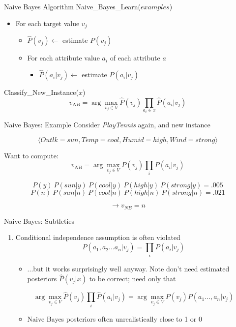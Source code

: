 \documentclass[%
pdf,
colorBG,
slideColor,
tcrico,
]{prosper}
\begin{document}
\begin{slide}{ Naive Bayes Algorithm   }  
\tiny
Naive\_Bayes\_Learn($examples$)
\begin{itemize} 
\item[]
For each target value $v_j$
\begin{itemize}
\item[]
$\hat{P}(v_j) \gets$ estimate $P(v_j)$
\item[] For each attribute value $a_i$ of each attribute $a$
\begin{itemize} \item[] $\hat{P}(a_i|v_j) \gets$ estimate $P(a_i|v_j)$ \end{itemize}
\end{itemize}
\end{itemize}

\vspace*{.2in}
Classify\_New\_Instance($x$)
\[ v_{NB} = \arg\max_{v_{j} \in V} \hat{P}(v_{j}) \prod_{a_i \in x} \hat{P}(a_{i} | v_{j}) \]
\end{slide}



\begin{slide}{ Naive Bayes: Example   }  
\tiny
Consider {\em PlayTennis} again, and new instance 

 \[\langle Outlk=sun, Temp=cool, Humid=high, Wind=strong \rangle \]

Want to compute:
\[ v_{NB} = \arg\max_{v_{j} \in V} P(v_{j}) \prod_{i} P(a_{i} | v_{j}) \]


\[P(y)\ P(sun|y)\ P(cool|y)\ P(high|y)\ P(strong|y) = .005 \]
\[P(n)\ P(sun|n)\ P(cool|n)\ P(high|n)\ P(strong|n) = .021 \]


\[ \to v_{NB} = n \]
\end{slide}


\begin{slide}{ Naive Bayes: Subtleties   }  
\tiny

\begin{enumerate}
\item Conditional independence assumption is often violated
\[ P(a_{1}, a_{2} \ldots a_{n}|v_{j}) = \prod_{i} P(a_{i} | v_{j}) \]

\begin{itemize}
\item ...but it works surprisingly well anyway.  Note don't need estimated posteriors $\hat{P}(v_j|x)$ to be correct; need only that 
\end{itemize}
\[\arg\max_{v_{j} \in V} \hat{P}(v_{j}) \prod_{i} \hat{P}(a_{i} | v_{j}) =
\arg\max_{v_{j} \in V}  P(v_{j}) P(a_{1} \ldots, a_n | v_{j}) \]

\begin{itemize}
\item Naive Bayes posteriors often unrealistically close to 1 or 0
\end{itemize}
\end{enumerate}
\end{slide}
\end{document}

